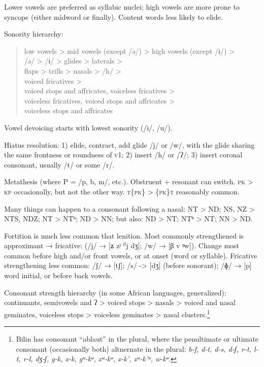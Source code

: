 \documentclass[11pt]{article}
\newcommand{\I}[1]{\textsc{#1}}   %
\begin{document}
Lower vowels are preferred as syllabic nuclei; high vowels are more
prone to syncope (either midword or finally).  Content words less
likely to elide.

Sonority hierarchy:
\begin{quotation}
\noindent low vowels > mid vowels (except /ə/) > high vowels (except /ɨ/) > \\
\indent /ə/ > /ɨ/ > glides > laterals > \\
\indent flaps > trills > nasals > /h/ > \\
\indent voiced fricatives > \\
\indent voiced stops and affricates, voiceless fricatives > \\
\indent voiceless fricatives, voiced stops and affricates > \\
\indent voiceless stops and affricates
\end{quotation}

Vowel devoicing starts with lowest sonority  (/i/, /u/).

Hiatus resolution: 1) elide, contract, add glide /j/ or /w/, with the
glide sharing the same frontness or roundness of \I{v1}; 2)
insert /h/ or /ʔ/; 3) insert coronal consonant, usually /t/ or some
/r/.

Metathesis (where P = /p, b, m/, etc.).  Obstruent + resonant can
switch.  \I{pk} > \I{kp} occasionally, but not the other way.
\I{t\{pk\}} > \I{\{pk\}t} reasonably common.

Many things can happen to a consonant following a nasal: NT > ND; NS,
NZ > NTS, NDZ; NT > NTʰ; ND > NN; but also: ND > NT; NTʰ > NT; NN >
ND.

Fortition is much less common that lenition.  Most commonly
strengthened is approximant → fricative: (/j/ → [ʑ zʲ $^\textrm{d}$j
dʒ]; /w/ → [β v ᶢw]).  Change most common before high and/or front
vowels, or at onset (word or syllable).  Fricative strengthening less
common: /ʃ/ → [tʃ]; /s/ -> [dʒ] (before sonorant); /ɸ/ → [p] word
initial, or before back vowels.

Consonant strength hierarchy (in some African languages, generalized):
continuants, semivowels and ʔ > voiced stops > nasals > voiced and
nasal geminates, voiceless stops > voiceless geminates > nasal
clusters.\footnote{Bilin has consonant ``ablaut'' in the plural, where
  the penultimate or ultimate consonant (occasionally both) altnernate
  in the plural: \textit{b-f, d-t, d-s, d-ʃ, r-t, l-t, r-l, dʒ-ʃ, g-k,
    x-k, gʷ-kʷ, xʷ-kʷ, x-k', xʷ-k'ʷ, w-kʷ}.}
\end{document}
